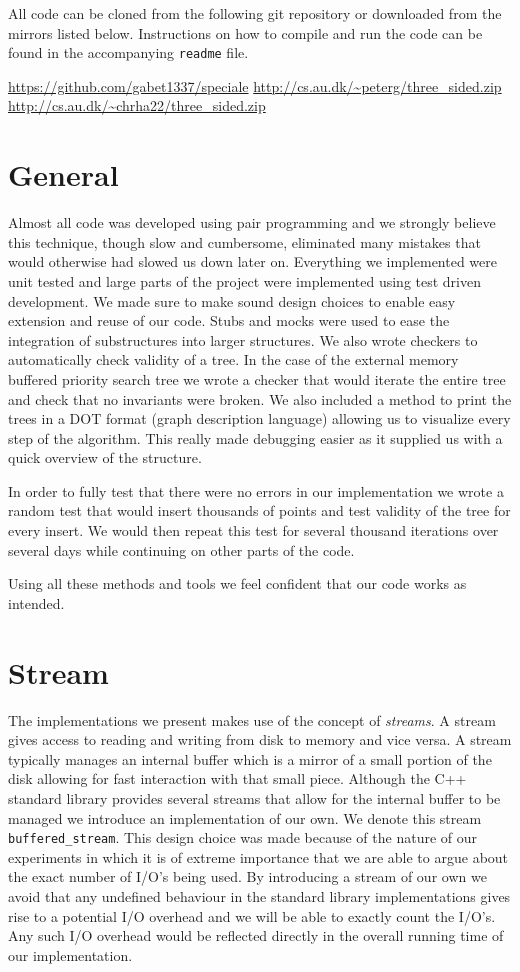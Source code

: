 \documentclass[twoside,11pt,openright]{report}
\begin{document}
All code can be cloned from the following git repository or downloaded from the mirrors listed below. Instructions on how to compile and run the code can be found in the accompanying \texttt{readme} file.

\begin{center}
\url{https://github.com/gabet1337/speciale}
\url{http://cs.au.dk/~peterg/three_sided.zip}
\url{http://cs.au.dk/~chrha22/three_sided.zip}
\end{center}

\section{General}
Almost all code was developed using pair programming and we strongly believe this technique, though slow and cumbersome, eliminated many mistakes that would otherwise had slowed us down later on.
Everything we implemented were unit tested and large parts of the project were implemented using test driven development. We made sure to make sound design choices to enable easy extension and reuse of our code. Stubs and mocks were used to ease the integration of substructures into larger structures.
We also wrote checkers to automatically check validity of a tree. In the case of the external memory buffered priority search tree we wrote a checker that would iterate the entire tree and check that no invariants were broken. We also included a method to print the trees in a DOT format (graph description language) allowing us to visualize every step of the algorithm. This really made debugging easier as it supplied us with a quick overview of the structure.

In order to fully test that there were no errors in our implementation we wrote a random test that would insert thousands of points and test validity of the tree for every insert. We would then repeat this test for several thousand iterations over several days while continuing on other parts of the code.

Using all these methods and tools we feel confident that our code works as intended.

\section{Stream}
The implementations we present makes use of the concept of \textit{streams}. A stream gives access to reading and writing from disk to memory and vice versa. A stream typically manages an internal buffer which is a mirror of a small portion of the disk allowing for fast interaction with that small piece. Although the C++ standard library provides several streams that allow for the internal buffer to be managed we introduce an implementation of our own. We denote this stream \texttt{buffered\_stream}. This design choice was made because of the nature of our experiments in which it is of extreme importance that we are able to argue about the exact number of I/O's being used. By introducing a stream of our own we avoid that any undefined behaviour in the standard library implementations gives rise to a potential I/O overhead and we will be able to exactly count the I/O's. Any such I/O overhead would be reflected directly in the overall running time of our implementation.
\end{document}
